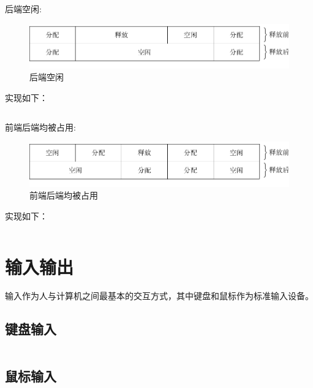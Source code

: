 \documentclass{swfcthesis}
\begin{document}
后端空闲:

\begin{figure}[h]
  \centering
  \includegraphics[width=.7\textwidth]{fig/mem2.pdf}
  \caption{后端空闲}
  \label{fig:mem3}
\end{figure}

实现如下：

\begin{listing}[H]
  \inputminted[tabsize=2, firstline=118, lastline=127,
  linenos=true]{c}{../ZOS/src/kernel/memory.c}
\end{listing}

前端后端均被占用:

\begin{figure}[h]
  \centering
  \includegraphics[width=.7\textwidth]{fig/mem3.pdf}
  \caption{前端后端均被占用}
  \label{fig:mem4}
\end{figure}

实现如下：

\begin{listing}[H]
  \inputminted[tabsize=2, firstline=128, lastline=141,
  linenos=true]{c}{../ZOS/src/kernel/memory.c}
\end{listing}

\section{输入输出}

输入作为人与计算机之间最基本的交互方式，其中键盘和鼠标作为标准输入设备。

\subsection{键盘输入}

\begin{listing}[H]
  \inputminted[tabsize=2, firstline=162, lastline=170,
  linenos=true]{c}{../ZOS/src/kernel/bootpack.c}
\end{listing}

\subsection{鼠标输入}
\end{document}
